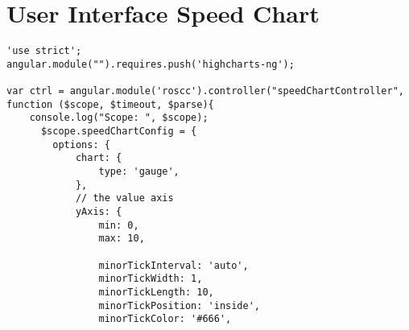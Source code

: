 \section*{User Interface Speed Chart}
\begin{lstlisting}[breaklines=true,basicstyle=\tiny]
'use strict';
angular.module("").requires.push('highcharts-ng');

var ctrl = angular.module('roscc').controller("speedChartController", function ($scope, $timeout, $parse){
    console.log("Scope: ", $scope);
      $scope.speedChartConfig = {
        options: {
            chart: {
                type: 'gauge',
            },
            // the value axis
            yAxis: {
                min: 0,
                max: 10,
                
                minorTickInterval: 'auto',
                minorTickWidth: 1,
                minorTickLength: 10,
                minorTickPosition: 'inside',
                minorTickColor: '#666',
        

\end{lstlisting}
